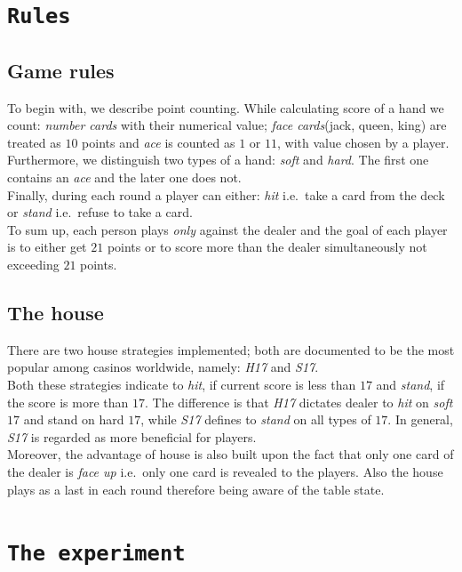 \documentclass[12pt,a4paper,twocolumn]{article}
\begin{document}
\section*{\texttt{Rules}}
\subsection*{Game rules}
To begin with, we describe point counting. While calculating score of a hand we count: \emph{number cards} with their numerical value; \emph{face cards}(jack, queen, king) are treated as $10$ points and \emph{ace} is counted as $1$ or $11$, with value chosen by a player.\\
Furthermore, we distinguish two types of a hand: \emph{soft} and \emph{hard}. The first one contains an \emph{ace} and the later one does not.\\
Finally, during each round a player can either: \emph{hit} i.e.\ take a card from the deck or \emph{stand} i.e.\ refuse to take a card.\\

To sum up, each person plays \emph{only} against the dealer and the goal of each player is to either get $21$ points or to score more than the dealer simultaneously not exceeding $21$ points.\\

\subsection*{The house}
There are two house strategies implemented; both are documented to be the most popular among casinos worldwide, namely: \emph{H17} and \emph{S17}.\\
Both these strategies indicate to \emph{hit}, if current score is less than $17$ and \emph{stand}, if the score is more than $17$. The difference is that \emph{H17} dictates dealer to \emph{hit} on \emph{soft} $17$ and stand on hard $17$, while \emph{S17} defines to \emph{stand} on all types of $17$. In general, \emph{S17} is regarded as more beneficial for players.\\

Moreover, the advantage of house is also built upon the fact that only one card of the dealer is \emph{face up} i.e.\ only one card is revealed to the players. Also the house plays as a last in each round therefore being aware of the table state.\\


\section*{\texttt{The experiment}}
\end{document}
